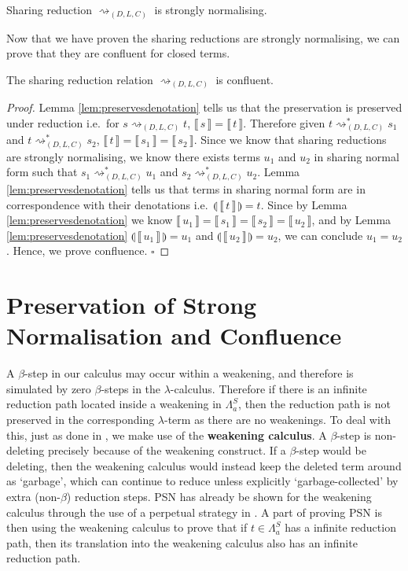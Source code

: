\documentclass[runningheads]{llncs}
\newcommand\defn{\textbf}
\newcommand{\FALC}{\Lambda^{S}_{a}}
\newcommand{\readback}[2]{\llbracket \, #1 \, \rrbracket}
\newcommand{\compile}[1]{\llparenthesis \, #1 \, \rrparenthesis}
\newcommand*{\QEDB}{\hfill\ensuremath{\square}}
\begin{document}
\begin{theorem}
\label{theo:sharingstronglynormal}
Sharing reduction $\rightsquigarrow_{(D, L, C)}$ is strongly normalising.
\end{theorem}

\noindent Now that we have proven the sharing reductions are strongly normalising, we can prove that they are confluent for closed terms.

\begin{theorem}
\label{theo:strongnormal}
The sharing reduction relation $\rightsquigarrow_{(D, L, C)}$ is confluent.
\end{theorem}
\begin{proof}
Lemma \ref{lem:preservesdenotation} tells us that the preservation is preserved under reduction i.e.\ for $s \rightsquigarrow_{(D, L, C)} t$, $\readback{s}{} = \readback{t}{}$. Therefore given $t \rightsquigarrow^{*}_{(D, L, C)} s_{1}$ and $t \rightsquigarrow^{*}_{(D, L, C)} s_{2}$, $\readback{t}{} = \readback{s_{1}}{} = \readback{s_{2}}{}$. Since we know that sharing reductions are strongly normalising, we know there exists terms $u_{1}$ and $u_{2}$ in sharing normal form such that $s_{1} \rightsquigarrow^{*}_{(D, L, C)} u_{1}$ and $s_{2} \rightsquigarrow^{*}_{(D, L, C)} u_{2}$. Lemma \ref{lem:preservesdenotation} tells us that terms in sharing normal form are in correspondence with their denotations i.e.\ $ \compile{\readback{t}{I}} = t $. Since by Lemma \ref{lem:preservesdenotation} we know $\readback{u_{1}}{} = \readback{s_{1}}{} = \readback{s_{2}}{} = \readback{u_{2}}{}$, and by Lemma \ref{lem:preservesdenotation} $ \compile{\readback{u_{1}}{I}} = u_{1} $ and $\compile{\readback{u_{2}}{I}} = u_{2}$, we can conclude $u_{1} = u_{2}$. Hence, we prove confluence. \QEDB
\end{proof}

\section{Preservation of Strong Normalisation and Confluence}
\label{chap:posn}

A $\beta$-step in our calculus may occur within a weakening, and therefore is simulated by zero $\beta$-steps in the $\lambda$-calculus. Therefore if there is an infinite reduction path located inside a weakening in $\FALC$, then the reduction path is not preserved in the corresponding $\lambda$-term as there are no weakenings. To deal with this, just as done in \cite{Accattoli-Kesner-2012,Gundersen-Heijltjes-Parigot-2013-LICS,He-2018}, we make use of the \defn{weakening calculus}. A $\beta$-step is non-deleting precisely because of the weakening construct. If a $\beta$-step would be deleting, then the weakening calculus would instead keep the deleted term around as `garbage', which can continue to reduce unless explicitly `garbage-collected' by extra (non-$\beta$) reduction steps. PSN has already be shown for the weakening calculus through the use of a perpetual strategy in \cite{Gundersen-Heijltjes-Parigot-2013-LICS}. A part of proving PSN is then using the weakening calculus to prove that if $t \in \FALC$ has a infinite reduction path, then its translation into the weakening calculus also has an infinite reduction path. 
\end{document}
